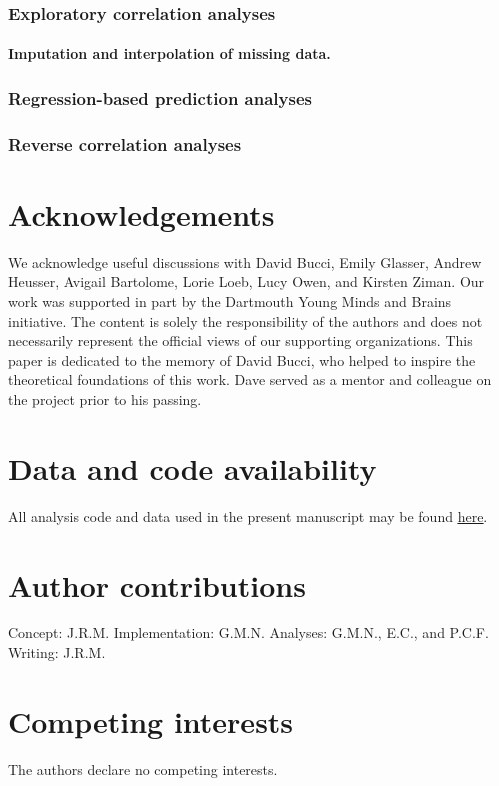 \documentclass[10pt]{article}
\begin{document}
\subsubsection*{Exploratory correlation analyses}
\paragraph*{Imputation and interpolation of missing data.}

\subsubsection*{Regression-based prediction analyses}

\subsubsection*{Reverse correlation analyses}




\section*{Acknowledgements}
We acknowledge useful discussions with David Bucci, Emily Glasser, Andrew Heusser, Avigail Bartolome, Lorie Loeb, Lucy Owen, and Kirsten Ziman.  Our work was supported in part by the Dartmouth Young Minds and Brains initiative.  The content is solely the responsibility of the authors and does not necessarily represent the official views of our supporting organizations.  This paper is dedicated to the memory of David Bucci, who helped to inspire the theoretical foundations of this work.  Dave served as a mentor and colleague on the project prior to his passing.


\section*{Data and code availability}
All analysis code and data used in the present manuscript may be found \href{https://github.com/ContextLab/brainfit-paper}{\underline{here}}.

\section*{Author contributions}
Concept: J.R.M.  Implementation: G.M.N.  Analyses: G.M.N., E.C., and P.C.F.  Writing: J.R.M.

\section*{Competing interests}
The authors declare no competing interests.



\end{document}
